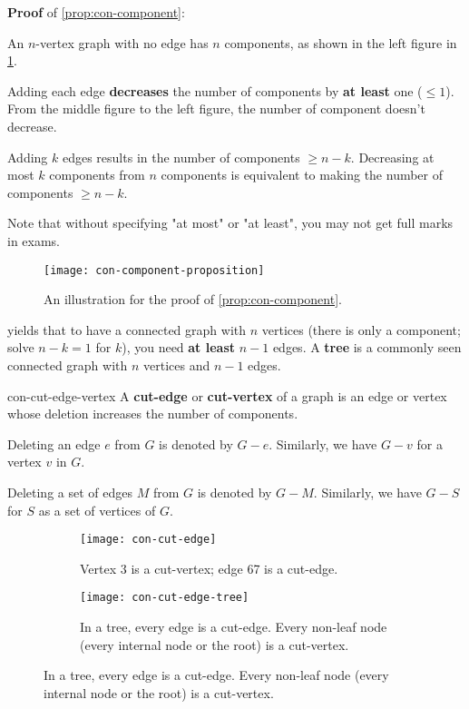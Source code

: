 \documentclass[../src/handouts/main.tex]{subfiles}
\begin{document}
\textbf{Proof} of \cref{prop:con-component}:
\begin{enumerate*}
  \item An $n$-vertex graph with no edge has $n$ components, as shown in the left figure in \cref{fig:con-component-proposition}.
  \item Adding each edge \textbf{decreases} the number of components by \textbf{at least} one ($\leq 1$). From the middle figure to the left figure, the number of component doesn't decrease.
  \item Adding $k$ edges results in the number of components $\geq n - k$. Decreasing at most $k$ components from $n$ components is equivalent to making the number of components $\geq n - k$.
  \item Note that without specifying "at most" or "at least", you may not get full marks in exams.
\end{enumerate*}

\begin{figure}[htbp]
  \centering
  \texttt{[image: con-component-proposition]}
  \caption{An illustration for the proof of \cref{prop:con-component}.}
  \label{fig:con-component-proposition}
\end{figure}

 yields that to have a connected graph with $n$ vertices (there is only a component; solve $n - k = 1$ for $k$), you need \textbf{at least} $n - 1$ edges. A \textbf{tree} is a commonly seen connected graph with $n$ vertices and $n - 1$ edges.

\begin{definition}{}{con-cut-edge-vertex}
  A \textbf{cut-edge} or \textbf{cut-vertex} of a graph is an edge or vertex whose deletion increases the number of components.

  Deleting an edge $e$ from $G$ is denoted by $G - e$.
  Similarly, we have $G - v$ for a vertex $v$ in $G$.

  Deleting a set of edges $M$ from $G$ is denoted by $G - M$.
  Similarly, we have $G - S$ for $S$ as a set of vertices of $G$.
\end{definition}

\begin{figure}[htbp]
  \centering
  \begin{subfigure}[t]{.3\textwidth}
    \centering
    \texttt{[image: con-cut-edge]}
    \caption{Vertex 3 is a cut-vertex; edge 67 is a cut-edge.}
    \label{fig:con-cut-edge}
  \end{subfigure}
  \hspace{.2\textwidth}
  \begin{subfigure}[t]{.4\textwidth}
    \centering
    \texttt{[image: con-cut-edge-tree]}
    \caption{In a tree, every edge is a cut-edge. Every non-leaf node (every internal node or the root) is a cut-vertex.}
    \label{fig:con-cut-edge-tree}
  \end{subfigure}
\end{figure}
\end{document}

